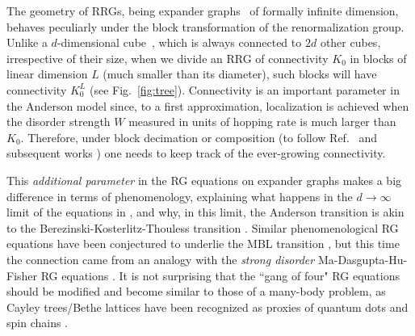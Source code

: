 \documentclass[reprint,aps,prl,superscriptaddress,english,nolongbibliography]{revtex4-1}
\begin{document}
The geometry of RRGs, being expander graphs~\cite{kowalski2019introduction} of formally infinite dimension, behaves peculiarly under the block transformation of the renormalization group. Unlike a $d$-dimensional cube~\cite{Tarquini2017critical}, which is always connected to $2d$ other cubes, irrespective of their size, when we divide an RRG of connectivity $K_0$ in blocks of linear dimension $L$ (much smaller than its diameter), such blocks will have connectivity $K_0^L$ (see Fig.~\ref{fig:tree}). Connectivity is an important parameter in the Anderson model since, to a first approximation, localization is achieved when the disorder strength $W$ measured in units of hopping rate is much larger than $K_{0}$. Therefore, under block decimation or composition (to follow Ref.~\cite{abrahams1979scaling} and subsequent works \cite{lee1979real}) one needs to keep track of the ever-growing connectivity.

This {\it additional parameter} in the RG equations on expander graphs makes a big difference in terms of phenomenology, explaining what happens in the $d\to\infty$ limit of the equations in \cite{abrahams1979scaling}, and why, in this limit, the Anderson transition is akin to the Berezinski-Kosterlitz-Thouless transition \cite{1971JETP...32..493B,1972JETP...34..610B,1973JPhC....6.1181K}. Similar phenomenological RG equations have been conjectured to underlie the MBL transition \cite{PhysRevX.5.031032,PhysRevX.5.031033,PhysRevB.93.224201,Dumitrescu2019KT}, but this time the connection came from an analogy with the {\it strong disorder} Ma-Dasgupta-Hu-Fisher RG equations \cite{ma1979random,dasgupta1980low,fisher1994random,huse2023strongrandomness}. It is not surprising that the ``gang of four" RG equations \cite{abrahams1979scaling} should be modified and become similar to those of a many-body problem, as Cayley trees/Bethe lattices have been recognized as proxies of quantum dots \cite{altshuler1997quasiparticle,sivan1994quasi} and spin chains \cite{Basko06,ros2015integrals,de2014anderson,tikhonov2021AndersonMBL}.
\end{document}
